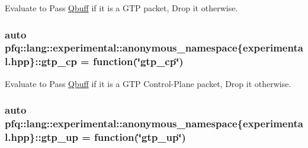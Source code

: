 Evaluate to {\ttfamily Pass} \hyperlink{structpfq_1_1lang_1_1Qbuff}{Qbuff} if it is a G\+TP packet, {\ttfamily Drop} it otherwise. 

\subsubsection[{\texorpdfstring{gtp\+\_\+cp}{gtp_cp}}]{\setlength{\rightskip}{0pt plus 5cm}auto pfq\+::lang\+::experimental\+::anonymous\+\_\+namespace\{experimental.\+hpp\}\+::gtp\+\_\+cp = {\bf function}(\char`\"{}gtp\+\_\+cp\char`\"{})}\hypertarget{namespacepfq_1_1lang_1_1experimental_1_1anonymous__namespace_02experimental_8hpp_03_a209a0ce5245cb37a38e0e4c6616e3604}{}\label{namespacepfq_1_1lang_1_1experimental_1_1anonymous__namespace_02experimental_8hpp_03_a209a0ce5245cb37a38e0e4c6616e3604}


Evaluate to {\ttfamily Pass} \hyperlink{structpfq_1_1lang_1_1Qbuff}{Qbuff} if it is a G\+TP Control-\/\+Plane packet, {\ttfamily Drop} it otherwise. 

\subsubsection[{\texorpdfstring{gtp\+\_\+up}{gtp_up}}]{\setlength{\rightskip}{0pt plus 5cm}auto pfq\+::lang\+::experimental\+::anonymous\+\_\+namespace\{experimental.\+hpp\}\+::gtp\+\_\+up = {\bf function}(\char`\"{}gtp\+\_\+up\char`\"{})}\hypertarget{namespacepfq_1_1lang_1_1experimental_1_1anonymous__namespace_02experimental_8hpp_03_ac8b95a754c8c3bbef4847904eaf6cb9b}{}\label{namespacepfq_1_1lang_1_1experimental_1_1anonymous__namespace_02experimental_8hpp_03_ac8b95a754c8c3bbef4847904eaf6cb9b}


